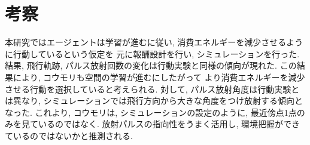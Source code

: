 \documentclass[../main]{subfiles}
\begin{document}
\section{考察}
本研究ではエージェントは学習が進むに従い, 
消費エネルギーを減少させるように行動しているという仮定を
元に報酬設計を行い, シミュレーションを行った.
結果, 飛行軌跡, パルス放射回数の変化は行動実験と同様の傾向が現れた.
この結果により,
コウモリも空間の学習が進むにしたがって
より消費エネルギーを減少させる行動を選択していると考えられる.
対して, パルス放射角度は行動実験とは異なり, 
シミュレーションでは飛行方向から大きな角度をつけ放射する傾向となった.
これより, コウモリは, シミュレーションの設定のように, 
最近傍点1点のみを見ているのではなく.
放射パルスの指向性をうまく活用し, 
環境把握ができているのではないかと推測される.
\end{document}
